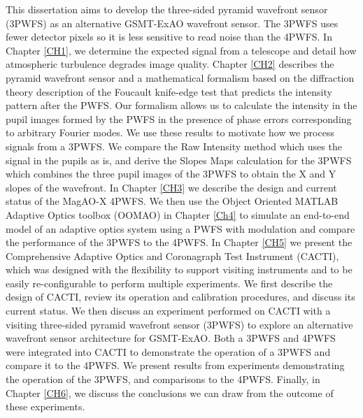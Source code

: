 This dissertation aims to develop the three-sided pyramid wavefront sensor (3PWFS) as an alternative GSMT-ExAO wavefront sensor. The 3PWFS  uses fewer detector pixels so it is less sensitive to read noise than the 4PWFS. In Chapter \ref{CH1}, we determine the expected signal from a telescope and detail how atmospheric turbulence degrades image quality. Chapter \ref{CH2} describes the pyramid wavefront sensor and a mathematical formalism based on the diffraction theory description of the Foucault knife-edge test that predicts the intensity pattern after the PWFS. Our formalism allows us to calculate the intensity in the pupil images formed by the PWFS in the presence of phase errors corresponding to arbitrary Fourier modes. We use these results to motivate how we process signals from a 3PWFS. We compare the Raw Intensity method which uses the signal in the pupils as is, and derive the Slopes Maps calculation for the 3PWFS which combines the three pupil images of the 3PWFS to obtain the X and Y slopes of the wavefront. In Chapter \ref{CH3} we describe the design and current status of the MagAO-X 4PWFS. We then use the Object Oriented MATLAB Adaptive Optics toolbox (OOMAO) in Chapter \ref{Ch4} to simulate an end-to-end model of an adaptive optics system using a PWFS with modulation and compare the performance of the 3PWFS to the 4PWFS. In Chapter \ref{CH5} we present the Comprehensive Adaptive Optics and Coronagraph Test Instrument (CACTI), which was designed with the flexibility to support visiting instruments and to be easily re-configurable to perform multiple experiments. We first describe the design of CACTI, review its operation and calibration procedures, and discuss its current status. We then discuss an experiment performed on CACTI with a visiting three-sided pyramid wavefront sensor (3PWFS) to explore an alternative wavefront sensor architecture for GSMT-ExAO. Both a 3PWFS and 4PWFS were integrated into  CACTI to demonstrate the operation of a 3PWFS and compare it to the 4PWFS. We present results from experiments demonstrating the operation of the 3PWFS, and comparisons to the 4PWFS. Finally, in Chapter \ref{CH6}, we discuss the conclusions we can draw from the outcome of these experiments.












%  
%


